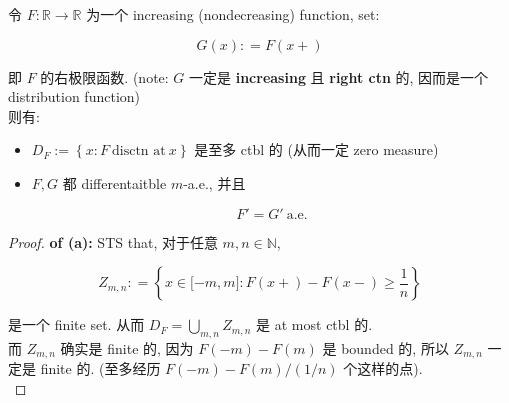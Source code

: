 \begin{theorem}{}

令 \(F:\mathbb{R}\rightarrow\mathbb{R}\) 为一个 increasing (nondecreasing) function, set:

\[G(x): = F(x + )\]

即 \(F\) 的右极限函数. (note: \(G\) 一定是 \textbf{increasing} 且 \textbf{right ctn} 的, 因而是一个 distribution function)\\
则有:

\begin{itemize}
\item
  \(D_{F} := \left\{ {x:F\ \text{disctn at}\ x} \right\}\) 是至多 ctbl 的 (从而一定 zero measure)
\item
  \(F,G\) 都 differentaitble \(m\)-a.e., 并且

  \[F' = G'\ \text{a.e.}\]
\end{itemize}

\end{theorem}

\begin{proof}

\textbf{of (a):} STS that, 对于任意 \(m,n \in \mathbb{N}\),

\[Z_{m,n}: = \left\{ {x \in \lbrack - m,m\rbrack:F(x + ) - F(x - ) \geq \frac{1}{n}} \right\}\]

是一个 finite set. 从而 \(D_{F} = \bigcup_{m,n}Z_{m,n}\) 是 at most ctbl 的.\\
而 \(Z_{m,n}\) 确实是 finite 的, 因为 \(F( - m) - F(m)\) 是 bounded 的, 所以 \(Z_{m,n}\) 一定是 finite 的. (至多经历 \(F( - m) - F(m)/(1/n)\) 个这样的点).\\

\end{proof}

